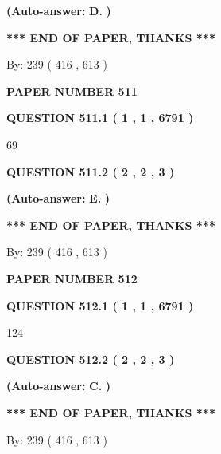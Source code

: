 \documentclass[12pt]{article}
\begin{document}
 
{\textbf{(Auto-answer:}}
{\textbf{\large{
D.}}}
{\textbf{)}}
 
 
   
   
   
   
\vspace{1.0in} 
{\textbf{\large{ *** END OF PAPER, THANKS *** }}} 
   
   
\hspace{1.0in} By: 
 239 ( 416 ,  613 )
   
   
   
   
\newpage 
\setcounter{page}{ 
   511001 } 
   
   
 {\textbf{ \Large{ PAPER NUMBER  511  }}}
   
   
   
   
  
  
{\textbf{\large{QUESTION
511.1 
 ( 1 , 1 , 6791 )
}}}

69
  
  
{\textbf{\large{QUESTION
511.2 
 ( 2 , 2 , 3 )
}}}
 
 
{\textbf{(Auto-answer:}}
{\textbf{\large{
E.}}}
{\textbf{)}}
 
 
   
   
   
   
\vspace{1.0in} 
{\textbf{\large{ *** END OF PAPER, THANKS *** }}} 
   
   
\hspace{1.0in} By: 
 239 ( 416 ,  613 )
   
   
   
   
\newpage 
\setcounter{page}{ 
   512001 } 
   
   
 {\textbf{ \Large{ PAPER NUMBER  512  }}}
   
   
   
   
  
  
{\textbf{\large{QUESTION
512.1 
 ( 1 , 1 , 6791 )
}}}

124
  
  
{\textbf{\large{QUESTION
512.2 
 ( 2 , 2 , 3 )
}}}
 
 
{\textbf{(Auto-answer:}}
{\textbf{\large{
C.}}}
{\textbf{)}}
 
 
   
   
   
   
\vspace{1.0in} 
{\textbf{\large{ *** END OF PAPER, THANKS *** }}} 
   
   
\hspace{1.0in} By: 
 239 ( 416 ,  613 )
   
   
   
\end{document}
